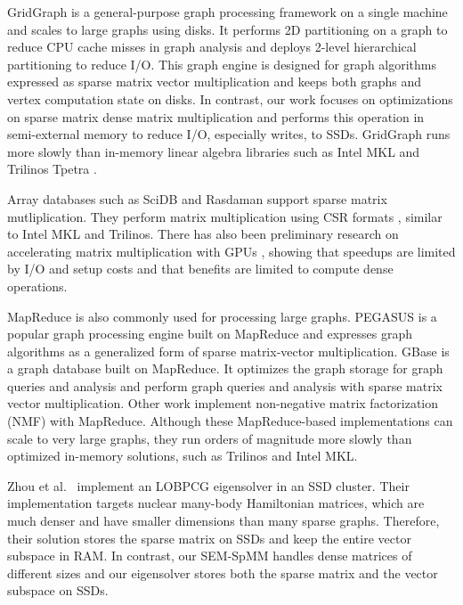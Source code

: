 GridGraph \cite{gridgraph} is a general-purpose graph processing framework on
a single machine
and scales to large graphs using disks. It performs 2D partitioning on a graph
to reduce CPU cache misses in graph analysis and deploys 2-level hierarchical
partitioning to reduce I/O. This graph engine is designed for graph
algorithms expressed as sparse matrix vector multiplication and keeps both
graphs and vertex computation state on disks. In contrast, our work focuses on
optimizations on sparse matrix dense matrix multiplication and performs this
operation in semi-external memory to reduce I/O, especially writes,
to SSDs. GridGraph runs more slowly than in-memory linear algebra libraries
such as Intel MKL \cite{mkl} and Trilinos Tpetra \cite{trilinos}.

Array databases such as SciDB \cite{scidb} and Rasdaman \cite{rasdaman} support
sparse matrix mutliplication. They perform matrix multiplication using CSR
formats \cite{SLACID}, similar to Intel MKL and Trilinos.  There has also been
preliminary research on accelerating matrix multiplication with GPUs \cite{Liu14},
showing that speedups are limited by I/O and setup costs and that benefits
are limited to compute dense operations.


MapReduce \cite{MapReduce} is also commonly used for processing large graphs.
PEGASUS \cite{pegasus} is a popular graph processing engine built on MapReduce
and expresses graph algorithms as a generalized form of sparse matrix-vector
multiplication. GBase \cite{gbase} is a graph database built on MapReduce.
It optimizes the graph storage for graph queries and analysis and perform graph
queries and analysis with sparse matrix vector multiplication.
Other work \cite{Liao14, Yin14, Liu10} implement non-negative matrix
factorization (NMF) with MapReduce. Although these MapReduce-based
implementations can scale to very large graphs, they run orders of
magnitude more slowly than optimized in-memory solutions, such as Trilinos and Intel MKL.

Zhou et al.~\cite{Zhou12} implement an LOBPCG \cite{Arbenz05} eigensolver in
an SSD cluster. Their implementation targets nuclear many-body Hamiltonian
matrices, which are much denser and have smaller dimensions than many sparse
graphs. Therefore, their solution stores the sparse matrix on SSDs and keep
the entire vector subspace in RAM. In contrast, our SEM-SpMM handles dense
matrices of different sizes and our eigensolver stores both the sparse matrix
and the vector subspace on SSDs.

